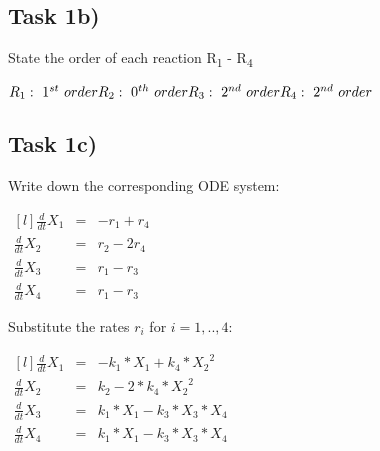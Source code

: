 \documentclass[]{scrartcl}
\begin{document}
\subsection*{Task 1b)}


State the order of each reaction R\textsubscript{1} - R\textsubscript{4}
\vspace{12pt}


\begin{center}
\noindent \begin{minipage}{.5\linewidth}
$
R_1: ~ 1^{st} ~ order \\
R_2: ~ 0^{th} ~ order \\
R_3: ~ 2^{nd} ~ order \\
R_4: ~ 2^{nd} ~ order
$
\end{minipage}
\end{center}


\subsection*{Task 1c)}


Write down the corresponding ODE system:
\vspace{12pt}


\begin{center}
\noindent \begin{minipage}{.5\linewidth}
$
\begin{matrix*}[l]
	\frac{d}{dt} X_1 & = & - r_1 + r_4		 \\ 
	\frac{d}{dt} X_2 & = & r_2 - 2 r_4	 \\
	\frac{d}{dt} X_3 & = & r_1 - r_3		 \\
	\frac{d}{dt} X_4 & = & r_1 - r_3		
\end{matrix*}
$
\end{minipage}
\end{center}


\vspace{12pt}

Substitute the rates $r_i$ for $i = 1,..,4$:

\vspace{12pt}

\begin{center}
\noindent \begin{minipage}{.5\linewidth}
$
\begin{matrix*}[l]
	\frac{d}{dt} X_1 & = & - k_1 * X_1 + k_4 * {X_2}^2		 \\ 
	\frac{d}{dt} X_2 & = & k_2 - 2 * k_4 * {X_2}^2	 \\
	\frac{d}{dt} X_3 & = & k_1 * X_1 - k_3 * X_3 * X_4	 \\
	\frac{d}{dt} X_4 & = & k_1 * X_1 - k_3 * X_3 * X_4		
\end{matrix*}
$
\end{minipage}
\end{center}
\end{document}
